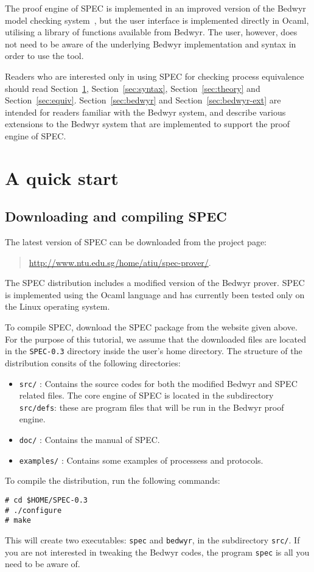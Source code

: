 \documentclass{article}
\newcommand\obj[1]{\texttt{#1}}
\begin{document}
The proof engine of SPEC is implemented in an improved version of 
the Bedwyr model checking system~\cite{baelde07cade}, 
but the user interface is implemented 
directly in Ocaml, utilising a library of functions available from Bedwyr. 
The user, however, does not need to be aware of the underlying
Bedwyr implementation and syntax in order to use the tool. 

Readers who are interested only in using SPEC for checking process equivalence
should read Section~\ref{sec:quick}, Section~\ref{sec:syntax}, Section~\ref{sec:theory} 
and Section~\ref{sec:equiv}.
Section~\ref{sec:bedwyr} and Section~\ref{sec:bedwyr-ext} are intended for
readers familiar with the Bedwyr system, and describe various extensions to the Bedwyr
system that are implemented to support the proof engine of SPEC.

\section{A quick start}
\label{sec:quick}

\subsection{Downloading and compiling SPEC}
The latest version of SPEC can be downloaded from the project page: 
\begin{quote}
\url{http://www.ntu.edu.sg/home/atiu/spec-prover/}.
\end{quote}

\noindent The SPEC distribution includes a modified version of the Bedwyr prover. 
SPEC is implemented using the Ocaml language and 
has currently been tested only on the Linux operating system.

To compile SPEC, download the SPEC package from the website given above.
For the purpose of this tutorial, we assume
that the downloaded files are located in the \obj{SPEC-0.3} directory inside
the user's home directory. 
The structure of the distribution consits of the following directories:
\begin{itemize}
\item \texttt{src/} : Contains the source codes for both the modified Bedwyr and SPEC related
files. The core engine of SPEC is located in the subdirectory \texttt{src/defs}: these are
program files that will be run in the Bedwyr proof engine. 

\item \texttt{doc/} : Contains the manual of SPEC.
\item \texttt{examples/} : Contains some examples of processess and protocols. 
\end{itemize}
To compile the distribution, run the following commands: 
\begin{verbatim}
# cd $HOME/SPEC-0.3
# ./configure
# make
\end{verbatim}
This will create two executables: \obj{spec} and \obj{bedwyr}, in the subdirectory \texttt{src/}.
If you are not interested in tweaking the Bedwyr codes, the program \texttt{spec} is all you
need to be aware of. 
\end{document}
